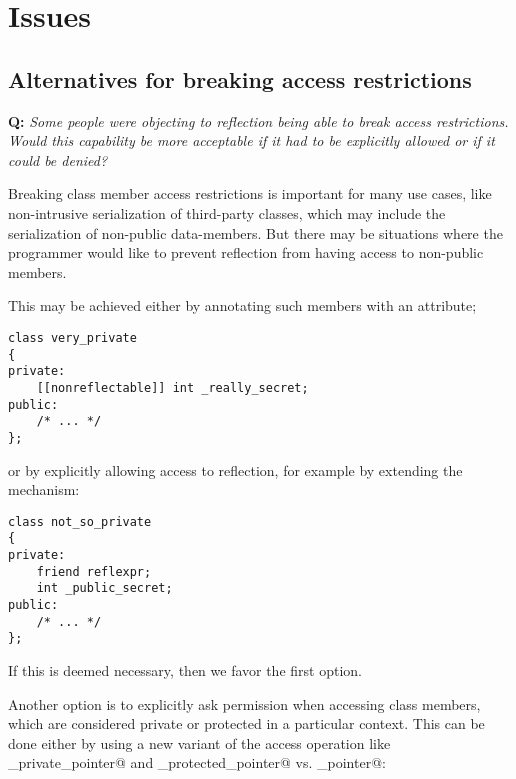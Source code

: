 \section{Issues}

\subsection{Alternatives for breaking access restrictions}
\label{issue-breaking-access}

\textbf{Q:} {\em Some people were objecting to reflection being able to break
access restrictions. Would this capability be more acceptable if it had to be
explicitly allowed or if it could be denied?}

Breaking class member access restrictions is important for many use cases,
like non-intrusive serialization of third-party classes, which may include
the serialization of non-public data-members.
But there may be situations where the programmer would like to prevent
reflection from having access to non-public members.

This may be achieved either by annotating such members with an attribute;

\begin{verbatim}
class very_private
{
private:
	[[nonreflectable]] int _really_secret;
public:
	/* ... */
};
\end{verbatim}

or by explicitly allowing access to reflection, for example by extending
the \verb@friend@ mechanism:

\begin{verbatim}
class not_so_private
{
private:
	friend reflexpr;
	int _public_secret;
public:
	/* ... */
};
\end{verbatim}

If this is deemed necessary, then we favor the first option.

Another option is to explicitly ask permission when accessing class members,
which are considered private or protected in a particular context.
This can be done either by using a new variant of the access operation
like \verb@get_private_pointer@ and \verb@get_protected_pointer@
vs. \verb@get_pointer@:

